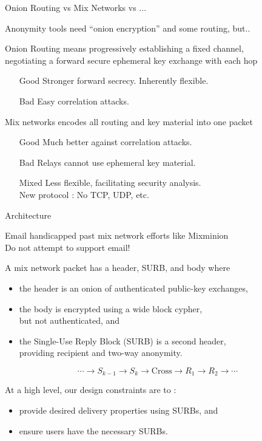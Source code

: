 \documentclass[fleqn,xcolor={usenames,dvipsnames}]{beamer}
\begin{document}
\begin{frame}[t]{Onion Routing vs Mix Networks vs ...}

Anonymity tools need ``onion encryption'' and some routing, but..

\bigskip

Onion Routing means progressively establishing a fixed channel, \\
negotiating a forward secure ephemeral key exchange with each hop \\
\begin{itemize}
\item[Good] Stronger forward secrecy.  Inherently flexible.
\item[Bad] Easy correlation attacks.
\end{itemize}

\medskip

Mix networks encodes all routing and key material into one packet
\begin{itemize}
\item[Good] Much better against correlation attacks.
\item[Bad] Relays cannot use ephemeral key material. 
\item[Mixed] Less flexible, facilitating security analysis. \\
  New protocol :  No TCP, UDP, etc.
\end{itemize}

\end{frame}


\begin{frame}{Architecture}

Email handicapped past mix network efforts like Mixminion \\
 \hspace*{10pt} Do not attempt to support email!
\medskip

A mix network packet has a header, SURB, and body where
\begin{itemize}
\item the header is an onion of authenticated public-key exchanges,
\item the body is encrypted using a wide block cypher, \\
  but not authenticated, and
\item the Single-Use Reply Block (SURB) is a second header, \\
 \hspace*{2pt} providing recipient and two-way anonymity.
\end{itemize}
\[ \cdots \to S_{k-1} \to S_k \to \textrm{Cross} \to R_1 \to R_2 \to \cdots \]

\medskip
\pause

At a high level, our design constraints are to : 
\begin{itemize}
\item provide desired delivery properties using SURBs, and 
\item ensure users have the necessary SURBs.
\end{itemize}

\end{frame}
\end{document}
